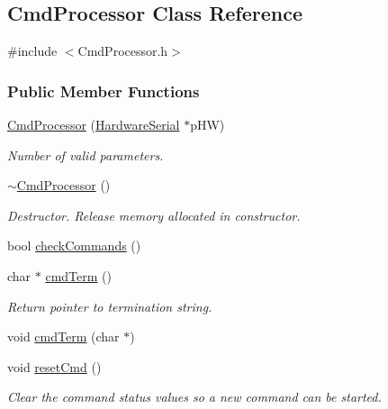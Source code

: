 \hypertarget{class_cmd_processor}{
\subsection{CmdProcessor Class Reference}
\label{class_cmd_processor}
}


{\ttfamily \#include $<$CmdProcessor.h$>$}

\subsubsection*{Public Member Functions}
\begin{DoxyCompactItemize}
\item 
\hyperlink{class_cmd_processor_a3594ccb1d9cb0f381315781ad3ac39dc}{CmdProcessor} (\hyperlink{class_hardware_serial}{HardwareSerial} $\ast$pHW)
\begin{DoxyCompactList}\small\item\em Number of valid parameters. \item\end{DoxyCompactList}\item 
\hyperlink{class_cmd_processor_a0e93fa7c4984326769ae51072638f50f}{$\sim$CmdProcessor} ()
\begin{DoxyCompactList}\small\item\em Destructor. Release memory allocated in constructor. \item\end{DoxyCompactList}\item 
bool \hyperlink{class_cmd_processor_ab674755157e105adb18ddeed073f0031}{checkCommands} ()
\item 
char $\ast$ \hyperlink{class_cmd_processor_a6044256dfce5684d00563c5a73f965d9}{cmdTerm} ()
\begin{DoxyCompactList}\small\item\em Return pointer to termination string. \item\end{DoxyCompactList}\item 
void \hyperlink{class_cmd_processor_a8cf275a12c84c86b9311612d134481aa}{cmdTerm} (char $\ast$)
\item 
void \hyperlink{class_cmd_processor_ab6265f95bc945842d519de1aaf5874c9}{resetCmd} ()
\begin{DoxyCompactList}\small\item\em Clear the command status values so a new command can be started. \item\end{DoxyCompactList}\item 

\end{DoxyCompactItemize}
